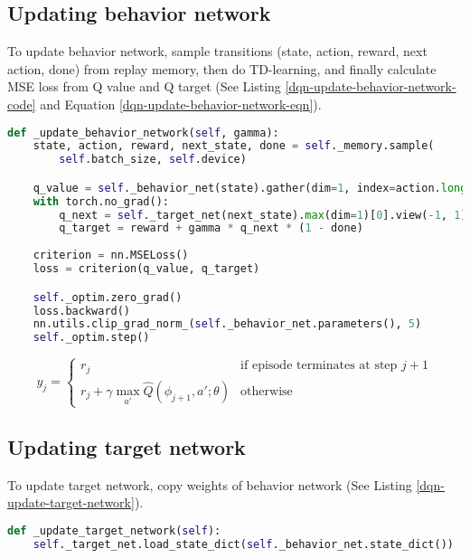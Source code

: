 \subsection{Updating behavior network}
\indent
    To update behavior network, sample transitions (state, action, reward, next action, done) from replay memory, then
    do TD-learning, and finally calculate MSE loss from Q value and Q target (See Listing \ref{dqn-update-behavior-network-code} and Equation \ref{dqn-update-behavior-network-eqn}).

\begin{lstlisting}[language=Python, caption={Python code of \textcolor{blue}{\textbf{\_update\_behavior\_network}} of DQN.}, label={dqn-update-behavior-network-code}]
def _update_behavior_network(self, gamma):
    state, action, reward, next_state, done = self._memory.sample(
        self.batch_size, self.device)

    q_value = self._behavior_net(state).gather(dim=1, index=action.long())
    with torch.no_grad():
        q_next = self._target_net(next_state).max(dim=1)[0].view(-1, 1)
        q_target = reward + gamma * q_next * (1 - done)
        
    criterion = nn.MSELoss()
    loss = criterion(q_value, q_target)

    self._optim.zero_grad()
    loss.backward()
    nn.utils.clip_grad_norm_(self._behavior_net.parameters(), 5)
    self._optim.step()\end{lstlisting}
    
\begin{equation}\label{dqn-update-behavior-network-eqn}
    y_j = 
    \begin{cases}
        r_j & \text{if episode terminates at step } j + 1 \\
        r_j + \gamma\max_{a'}\hat{Q}\left(\phi_{j + 1}, a'; \theta\right) & \text{otherwise}
    \end{cases}
\end{equation}
        
\subsection{Updating target network}
\indent
    To update target network, copy weights of behavior network (See Listing \ref{dqn-update-target-network}).

\begin{lstlisting}[language=Python, caption={Python code of \textcolor{blue}{\textbf{\_update\_target\_network}} of DQN.}, label={dqn-update-target-network}]
def _update_target_network(self):
    self._target_net.load_state_dict(self._behavior_net.state_dict())\end{lstlisting}

